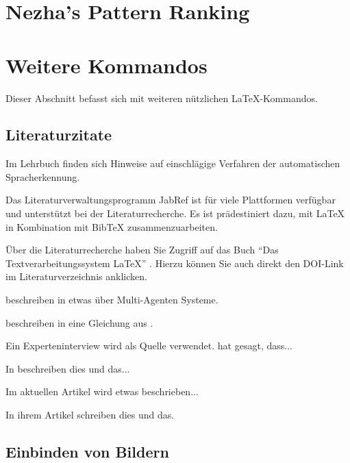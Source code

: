 \section{Nezha’s Pattern Ranking}


\section{Weitere Kommandos}
Dieser Abschnitt befasst sich mit weiteren nützlichen \LaTeX-Kommandos.

\subsection{Literaturzitate}
\label{sec:literaturzitate}

Im Lehrbuch \autocite{Schukat-Talamazzini1995}
finden sich Hinweise auf einschlägige Verfahren der automatischen Spracherkennung.

Das Literaturverwaltungsprogramm JabRef \autocite{Kopp2018} ist für viele Plattformen verfügbar und unterstützt bei der Literaturrecherche. Es ist prädestiniert dazu, mit {\LaTeX} in Kombination mit {Bib\TeX} zusammenzuarbeiten.

Über die Literaturrecherche haben Sie Zugriff auf das Buch "`Das Textverarbeitungssystem LaTeX"' \autocite[S. 15]{Oechsner2015}. Hierzu können Sie auch direkt den DOI-Link im Literaturverzeichnis anklicken.

\citeauthor{TyrinMultiAgent2012} beschreiben in \autocite{TyrinMultiAgent2012} etwas über Multi-Agenten Systeme. 

\citeauthor{Ghazali2012} beschreiben in \autocite{Ghazali2012} eine Gleichung aus \autocite{moore2007basic}.

Ein Experteninterview wird als Quelle verwendet. \citeauthor{Interviewpartnerin2021} hat gesagt, dass... \autocite[Aussage-Nr]{Interviewpartnerin2021}

In \autocite{Mamache2022} beschreiben \citeauthor{Mamache2022} dies und das...

Im aktuellen Artikel \autocite{Schaible2023} wird etwas beschrieben...

In ihrem Artikel \autocite[S. 18]{Oechsner2015} schreiben \citeauthor{Oechsner2015} dies und das.


\subsection{Einbinden von Bildern}

